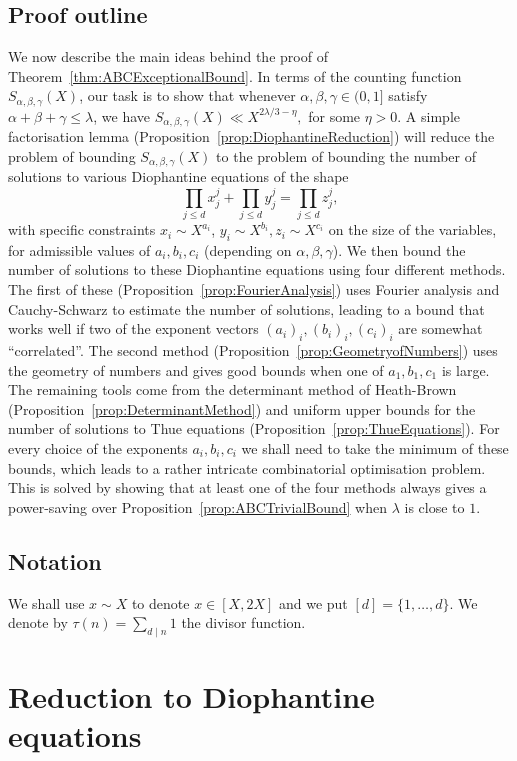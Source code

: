 \section*{Proof outline} We now describe the main ideas behind the proof of Theorem~\ref{thm:ABCExceptionalBound}. In terms of the counting function $S_{\alpha,\beta,\gamma}(X)$, our task is to show that whenever $\alpha,\beta,\gamma\in (0,1]$ satisfy $\alpha+\beta+\gamma\leq \lambda$, we have
$
S_{\alpha,\beta,\gamma}(X)\ll X^{2\lambda/3-\eta},
$
for some $\eta>0$.
A simple factorisation lemma (Proposition~\ref{prop:DiophantineReduction}) will reduce the problem of bounding $S_{\alpha,\beta,\gamma}(X)$ to the problem of bounding the number of solutions to various Diophantine equations of the shape
\[
\prod_{j\leq d}x_j^j+\prod_{j\leq d}y_j^j=\prod_{j\leq d}z_j^j ,
\]
with specific constraints $x_i\sim X^{a_i}$, $y_i\sim X^{b_i}, z_i\sim X^{c_i}$ on the size of the variables, for admissible values of $a_i,b_i,c_i$ (depending on $\alpha,\beta,\gamma$).
We then bound the number of solutions to these Diophantine equations using four different methods. The first of these (Proposition~\ref{prop:FourierAnalysis}) uses Fourier analysis and Cauchy-Schwarz to estimate the number of solutions, leading to a bound that works well if two of the exponent vectors $(a_i)_i,(b_i)_i,(c_i)_i$ are somewhat ``correlated''. The second method (Proposition~\ref{prop:GeometryofNumbers}) uses the geometry of numbers and gives good bounds when
one of $a_1,b_1,c_1$ is large. The remaining tools come from the determinant method of Heath-Brown (Proposition~\ref{prop:DeterminantMethod}) and
uniform upper bounds for the number of solutions to Thue equations (Proposition~\ref{prop:ThueEquations}).
For every choice of the exponents $a_i,b_i,c_i$ we shall need to take the minimum of these bounds, which leads to a rather intricate combinatorial optimisation problem. This is solved by showing that at least one of the four methods always gives a power-saving over Proposition~\ref{prop:ABCTrivialBound} when $\lambda$ is close to $1$.

\section*{Notation}
We shall use $x\sim X$ to denote $x\in [X,2X]$ and we put
$[d]=\{1,\dots,d\}$. We denote by $\tau(n)=\sum_{d\mid n}1$ the divisor function.


\chapter{Reduction to Diophantine equations}

